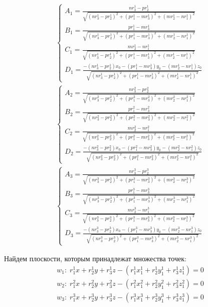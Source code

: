 $$\begin{gathered}
	\begin{cases}
		A_1 = \frac{n r_3^1 - p r_2^1}{\sqrt{(n r_3^1 - p r_2^1)^2 + (p r_1^1 - m r_3^1)^2 + (m r_2^1 - n r_1^1)^2}} \\
		B_1 = \frac{p r_1^1 - m r_3^1}{\sqrt{(n r_3^1 - p r_2^1)^2 + (p r_1^1 - m r_3^1)^2 + (m r_2^1 - n r_1^1)^2}} \\
		C_1 = \frac{m r_2^1 - n r_1^1}{\sqrt{(n r_3^1 - p r_2^1)^2 + (p r_1^1 - m r_3^1)^2 + (m r_2^1 - n r_1^1)^2}} \\
		D_1 = \frac{- (n r_3^1 - p r_2^1) x_0 - (p r_1^1 - m r_3^1) y_0 - (m r_2^1 - n r_1^1) z_0}{\sqrt{(n r_3^1 - p r_2^1)^2 + (p r_1^1 - m r_3^1)^2 + (m r_2^1 - n r_1^1)^2}}
	\end{cases} \\
	\begin{cases}
		A_2 = \frac{n r_3^2 - p r_2^2}{\sqrt{(n r_3^2 - p r_2^2)^2 + (p r_1^2 - m r_3^2)^2 + (m r_2^2 - n r_1^2)^2}} \\
		B_2 = \frac{p r_1^2 - m r_3^2}{\sqrt{(n r_3^2 - p r_2^2)^2 + (p r_1^2 - m r_3^2)^2 + (m r_2^2 - n r_1^2)^2}} \\
		C_2 = \frac{m r_2^2 - n r_1^2}{\sqrt{(n r_3^2 - p r_2^2)^2 + (p r_1^2 - m r_3^2)^2 + (m r_2^2 - n r_1^2)^2}} \\
		D_2 = \frac{- (n r_3^2 - p r_2^2) x_0 - (p r_1^2 - m r_3^2) y_0 - (m r_2^2 - n r_1^2) z_0}{\sqrt{(n r_3^2 - p r_2^2)^2 + (p r_1^2 - m r_3^2)^2 + (m r_2^2 - n r_1^2)^2}}
	\end{cases} \\
	\begin{cases}
		A_3 = \frac{n r_3^3 - p r_2^3}{\sqrt{(n r_3^3 - p r_2^3)^2 + (p r_1^3 - m r_3^3)^2 + (m r_2^3 - n r_1^3)^2}} \\
		B_3 = \frac{p r_1^3 - m r_3^3}{\sqrt{(n r_3^3 - p r_2^3)^2 + (p r_1^3 - m r_3^3)^2 + (m r_2^3 - n r_1^3)^2}} \\
		C_3 = \frac{m r_2^3 - n r_1^3}{\sqrt{(n r_3^3 - p r_2^3)^2 + (p r_1^3 - m r_3^3)^2 + (m r_2^3 - n r_1^3)^2}} \\
		D_3 = \frac{- (n r_3^3 - p r_2^3) x_0 - (p r_1^3 - m r_3^3) y_0 - (m r_2^3 - n r_1^3) z_0}{\sqrt{(n r_3^3 - p r_2^3)^2 + (p r_1^3 - m r_3^3)^2 + (m r_2^3 - n r_1^3)^2}}
	\end{cases}
\end{gathered}$$

Найдем плоскости, которым принадлежат множества точек:
$$\begin{gathered}
	w_1: \; r_1^1 x + r_2^1 y + r_3^1 z - (r_1^1 x_1^1 + r_2^1 y_1^1 + r_3^1 z_1^1) = 0 \\
	w_2: \; r_1^2 x + r_2^2 y + r_3^2 z - (r_1^2 x_1^2 + r_2^2 y_1^2 + r_3^2 z_1^2) = 0 \\
	w_3: \; r_1^3 x + r_2^3 y + r_3^3 z - (r_1^3 x_1^3 + r_2^3 y_1^3 + r_3^3 z_1^3) = 0
\end{gathered}$$

